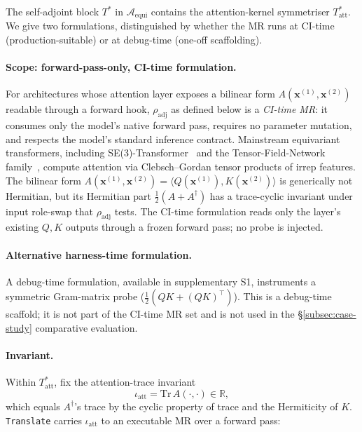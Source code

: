 \documentclass[manuscript]{acmart}
\begin{document}
The self-adjoint block $T^{*}$ in $\mathcal{A}_{\mathrm{equi}}$ contains the attention-kernel symmetriser $T^{*}_{\mathrm{att}}$. We give two formulations, distinguished by whether the MR runs at CI-time (production-suitable) or at debug-time (one-off scaffolding).

\paragraph{Scope: forward-pass-only, CI-time formulation.} For architectures whose attention layer exposes a bilinear form $A(\mathbf{x}^{(1)}, \mathbf{x}^{(2)})$ readable through a forward hook, $\rho_{\mathrm{adj}}$ as defined below is a \emph{CI-time MR}: it consumes only the model's native forward pass, requires no parameter mutation, and respects the model's standard inference contract. Mainstream equivariant transformers, including SE(3)-Transformer~\cite{FuchsTransformer2020} and the Tensor-Field-Network family~\cite{ThomasSmidt2018}, compute attention via Clebsch--Gordan tensor products of irrep features. The bilinear form $A(\mathbf{x}^{(1)}, \mathbf{x}^{(2)}) = \langle Q(\mathbf{x}^{(1)}), K(\mathbf{x}^{(2)}) \rangle$ is generically not Hermitian, but its Hermitian part $\tfrac{1}{2}(A + A^{\dagger})$ has a trace-cyclic invariant under input role-swap that $\rho_{\mathrm{adj}}$ tests. The CI-time formulation reads only the layer's existing $Q,K$ outputs through a frozen forward pass; no probe is injected.

\paragraph{Alternative harness-time formulation.} A debug-time formulation, available in supplementary S1, instruments a symmetric Gram-matrix probe ($\frac{1}{2}(QK + (QK)^\top)$). This is a debug-time scaffold; it is not part of the CI-time MR set and is not used in the §\ref{subsec:case-study} comparative evaluation.

\paragraph{Invariant.} Within $T^{*}_{\mathrm{att}}$, fix the attention-trace invariant
$$\iota_{\mathrm{att}} = \mathrm{Tr}\,A(\cdot, \cdot) \in \mathbb{R},$$
which equals $A^{\dagger}$'s trace by the cyclic property of trace and the Hermiticity of $K$. \texttt{Translate} carries $\iota_{\mathrm{att}}$ to an executable MR over a forward pass:
\end{document}
